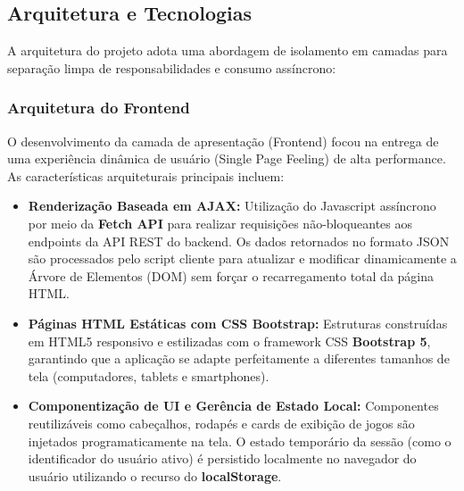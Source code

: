 \documentclass[12pt,a4paper]{article}
\begin{document}
\subsection{Arquitetura e Tecnologias}
A arquitetura do projeto adota uma abordagem de isolamento em camadas para separação limpa de responsabilidades e consumo assíncrono:

\subsubsection{Arquitetura do Frontend}
O desenvolvimento da camada de apresentação (Frontend) focou na entrega de uma experiência dinâmica de usuário (Single Page Feeling) de alta performance. As características arquiteturais principais incluem:
\begin{itemize}
    \item \textbf{Renderização Baseada em AJAX:} Utilização do Javascript assíncrono por meio da \textbf{Fetch API} para realizar requisições não-bloqueantes aos endpoints da API REST do backend. Os dados retornados no formato JSON são processados pelo script cliente para atualizar e modificar dinamicamente a Árvore de Elementos (DOM) sem forçar o recarregamento total da página HTML.
    \item \textbf{Páginas HTML Estáticas com CSS Bootstrap:} Estruturas construídas em HTML5 responsivo e estilizadas com o framework CSS \textbf{Bootstrap 5}, garantindo que a aplicação se adapte perfeitamente a diferentes tamanhos de tela (computadores, tablets e smartphones).
    \item \textbf{Componentização de UI e Gerência de Estado Local:} Componentes reutilizáveis como cabeçalhos, rodapés e cards de exibição de jogos são injetados programaticamente na tela. O estado temporário da sessão (como o identificador do usuário ativo) é persistido localmente no navegador do usuário utilizando o recurso do \textbf{localStorage}.
\end{itemize}
\end{document}
